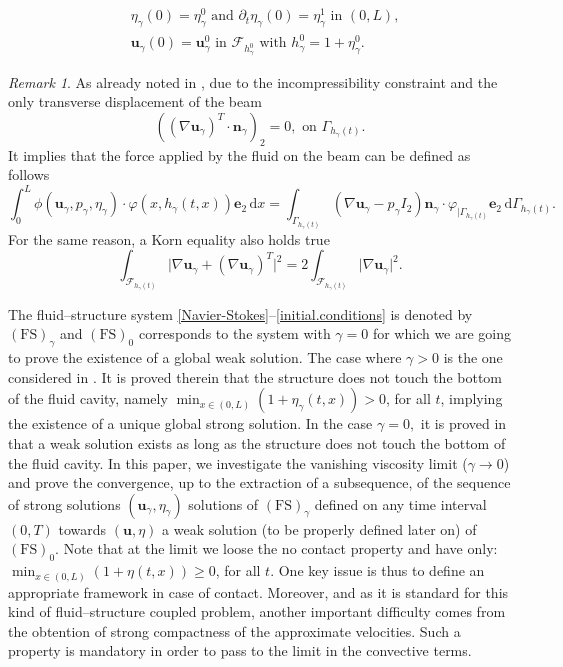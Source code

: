 \documentclass[JEP,XML,SOM,Unicode,NoFloatCountersInSection]{cedram}
\let\mathcal\mathscr
\newcommand{\FS}{\mathrm{FS}}
\theoremstyle{remark}
\newtheorem{remark}[theorem]{Remark}
\theoremstyle{definition}
\newcommand{\ug}{\boldsymbol{u}}
\newcommand{\dd}{\,\mathrm{d}}
\newcommand{\normal}{\BS{n}}
\newcommand{\BS}[1]{\boldsymbol{#1}}
\begin{document}
\begin{equation}\label{initial.conditions}
\begin{aligned}
&\eta_{\gamma}(0)=\eta^{0}_\gamma\text{ and }\partial_{t}\eta_{\gamma}(0)=\eta_\gamma^{1}\text{ in }(0,L),\\
&\ug_{\gamma}(0)=\ug_\gamma^{0}\text{ in }\mathcal{F}_{h_\gamma^{0}}\text{ with }h_\gamma^{0}=1+\eta_\gamma^{0}.
\end{aligned}
\end{equation}
\begin{remark}\label{rem:korn}
As already noted in \cite{Chambolle-etal}, due to the incompressibility constraint and the only transverse displacement of the beam
\[
\left((\nabla \ug_\gamma)^T\cdot\normal_\gamma\right)_2=0, \text{ on }\Gamma_{h_{\gamma}(t)}.
\]
It implies that the force applied by the fluid on the beam can be defined as follows
\[
\int_{0}^{L}\phi(\ug_{\gamma},p_{\gamma},\eta_{\gamma})\cdot \varphi(x,h_{\gamma}(t,x))\BS{e}_{2}\dd x=\int_{\Gamma_{h_{\gamma}(t)}}(\nabla\ug_{\gamma}-p_{\gamma}I_2)\normal_{\gamma}\cdot \varphi_{\vert\Gamma_{h_{\gamma}(t)}}\BS{e}_{2}\dd\Gamma_{h_{\gamma}(t)}.
\]
For the same reason, a Korn equality also holds true
\[
\int_{\mathcal{F}_{h_\gamma(t)}} \vert\nabla\ug_{\gamma} +( \nabla\ug_{\gamma})^{T}\vert^2 =2\int_{\mathcal{F}_{h_\gamma(t)}} \vert\nabla\ug_{\gamma} \vert^2.
\]
\end{remark}

The fluid--structure system \eqref{Navier-Stokes}--\eqref{initial.conditions} is denoted by $(\FS)_{\gamma}$ and $(\FS)_0$ corresponds to the system with $\gamma=0$ for which we are going to prove the existence of a global weak solution.
The case where $\gamma>0$ is the one considered in \cite{Grandmont-Hillairet}. It is proved therein that the structure does not touch the bottom of the fluid cavity, namely $\min_{x\in (0, L)}(1+\eta_\gamma(t, x)) >0$, for all $t$, implying the existence of a unique global strong solution. In the case $\gamma=0,$ it is proved in \cite{Grandmont08, Muha-Canic13} that a weak solution exists as long as the structure does not touch the bottom of the fluid cavity. In this paper, we investigate the vanishing viscosity limit (\ie $\gamma\to 0$) and prove the convergence, up to the extraction of a subsequence, of the sequence of strong solutions $(\ug_\gamma,\eta_\gamma)$ solutions of $(\FS)_{\gamma}$ defined on any time interval $(0, T)$ towards $(\ug, \eta)$ a weak solution (to be properly defined later on) of $(\FS)_0$. Note that at the limit we loose the no contact property and have only: $\min_{x\in (0, L)}(1+\eta(t, x))\geq 0$, for all $t$. One key issue is thus to define an appropriate framework in case of contact. Moreover, and as it is standard for this kind of fluid--structure coupled problem, another important difficulty comes from the obtention of strong compactness of the approximate velocities. Such a property is mandatory in order to pass to the limit in the convective terms.
 
\end{document}
